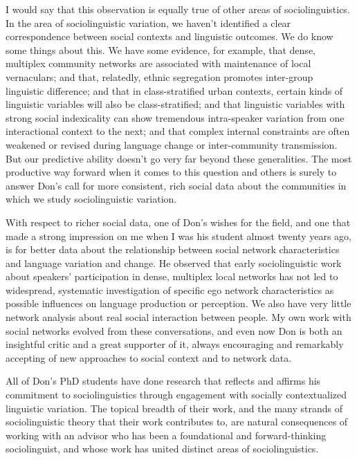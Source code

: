 \documentclass[output=paper, colorlinks,citecolor=brown]{langscibook}
\begin{document}
I would say that this observation is equally true of other areas of sociolinguistics. In the area of sociolinguistic variation, we haven't identified a clear correspondence between social contexts and linguistic outcomes. We do know some things about this. We have some evidence, for example, that dense, multiplex community networks are associated with maintenance of local vernaculars; and that, relatedly, ethnic segregation promotes inter-group linguistic difference; and that in class-stratified urban contexts, certain kinds of linguistic variables will also be class-stratified; and that linguistic variables with strong social indexicality can show tremendous intra-speaker variation from one interactional context to the next; and that complex internal constraints are often weakened or revised during language change or inter-community transmission. But our predictive ability doesn't go very far beyond these generalities. The most productive way forward when it comes to this question and others is surely to answer Don's call for more consistent, rich social data about the communities in which we study sociolinguistic variation.

With respect to richer social data, one of Don's wishes for the field, and one that made a strong impression on me when I was his student almost twenty years ago, is for better data about the relationship between social network characteristics and language variation and change. He observed that early sociolinguistic work about speakers' participation in dense, multiplex local networks has not led to widespread, systematic investigation of specific ego network characteristics as possible influences on language production or perception. We also have very little network analysis about real social interaction between people. My own work with social networks evolved from these conversations, and even now Don is both an insightful critic and a great supporter of it, always encouraging and remarkably accepting of new approaches to social context and to network data.

All of Don's PhD students have done research that reflects and affirms his commitment to sociolinguistics through engagement with socially contextualized linguistic variation. The topical breadth of their work, and the many strands of sociolinguistic theory that their work contributes to, are natural consequences of working with an advisor who has been a foundational and forward-thinking sociolinguist, and whose work has united distinct areas of sociolinguistics.  
\end{document}
